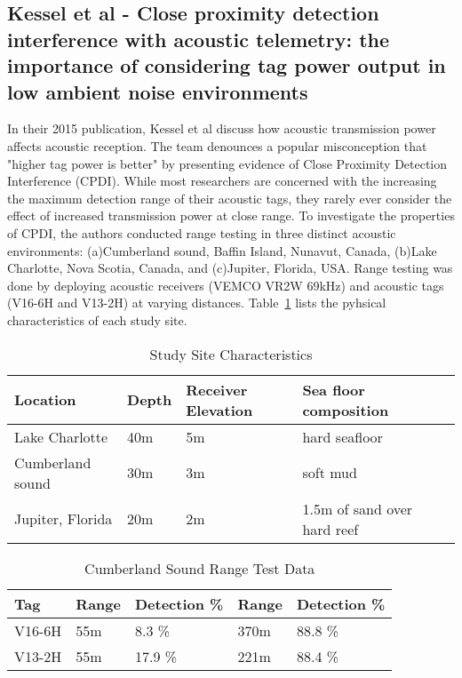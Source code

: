 \subsection{Kessel et al - Close proximity detection interference with acoustic telemetry: the importance of considering tag power output in low ambient noise environments}
In their 2015 publication, Kessel et al\cite{Kessel2015} discuss how acoustic transmission power affects acoustic reception.  The team denounces a popular misconception that "higher tag power is better" by presenting evidence of Close Proximity Detection Interference (CPDI).  While most researchers are concerned with the increasing the maximum detection range of their acoustic tags, they rarely ever consider the effect of increased transmission power at close range.  To investigate the properties of CPDI, the authors conducted range testing in three distinct acoustic environments: (a)Cumberland sound, Baffin Island, Nunavut, Canada, (b)Lake Charlotte, Nova Scotia, Canada, and (c)Jupiter, Florida, USA.  Range testing was done by deploying acoustic receivers (VEMCO VR2W 69kHz) and acoustic tags (V16-6H and V13-2H) at varying distances.  Table~\ref{CPDItable} lists the pyhsical characteristics of each study site.

\begin{table}[ht]
	\begin{tabular}{l l l l l}
		Location&Depth&Receiver Elevation&Sea floor composition\\
		\hline
		Lake Charlotte			& 40m	& 5m	& hard seafloor \\
		Cumberland sound		& 30m	& 3m	& soft mud	\\
		Jupiter, Florida		& 20m	& 2m	& 1.5m of sand over hard reef\\
	\end{tabular}
	\caption{Study Site Characteristics
		\label{CPDItable}}
\end{table}

\begin{table}[ht]
	\begin{tabular}{l l l l l}
		Tag	&Range	&Detection \%	&Range	&Detection \%\\
		\hline
		V16-6H	&55m	& 8.3 \%		&370m	&88.8 \%\\
		V13-2H	&55m 	& 17.9 \%	&221m	&88.4 \%\\
	\end{tabular}
	\caption{Cumberland Sound Range Test Data
		\label{rangeTestData}}
\end{table}

